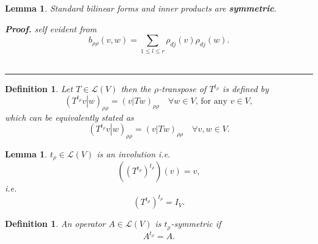 \documentclass[aps,preprint]{revtex4}
\newtheorem{definition}[theorem]{Definition}
\newtheorem{lemma}[theorem]{Lemma}
\newenvironment{proof}[1][Proof]{\noindent\textbf{#1.} }{\ \rule{0.5em}{0.5em}}
\begin{document}
\begin{lemma}
Standard bilinear forms and inner products are \textbf{symmetric}.

\begin{proof}
self evident from 
\begin{equation}
b_{\rho \rho }\left( v,w\right) =\sum_{1\leq l\leq r}\rho _{dj}\left(
v\right) \rho _{dj}\left( w\right) .
\end{equation}
\end{proof}
\end{lemma}

\begin{definition}
Let $T\in \mathcal{L}\left( V\right) $ then the $\rho $\emph{-transpose} of $%
T^{t_{\rho }}$ is defined by 
\begin{equation}
\left( \left. T^{t_{\rho }}v\right\vert w\right) _{\rho \rho }=\left( \left.
v\right\vert Tw\right) _{\rho \rho }\quad \forall w\in V,\,\text{for any }%
v\in V,
\end{equation}%
which can be equivalently stated as 
\begin{equation}
\left( \left. T^{t_{\rho }}v\right\vert w\right) _{\rho \rho }=\left( \left.
v\right\vert Tw\right) _{\rho \rho }\quad \forall v,w\in V.
\end{equation}
\end{definition}

\begin{lemma}
$t_{\rho }\in \mathcal{L}\left( V\right) $ is an involution i.e. 
\begin{equation}
\left( \overset{}{\left( T^{t_{\rho }}\right) ^{t_{\rho }}}\right) \left( 
\overset{}{v}\right) =v,
\end{equation}%
i.e. 
\begin{equation}
\left( T^{t_{\rho }}\right) ^{t_{\rho }}=I_{V}.
\end{equation}
\end{lemma}

\begin{definition}
An operator $A\in \mathcal{L}\left( V\right) $ is $t_{\rho }$\emph{-symmetric%
} if 
\begin{equation}
A^{t_{\rho }}=A.
\end{equation}
\end{definition}
\end{document}
